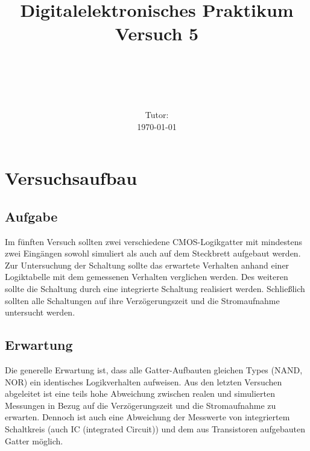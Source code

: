 \documentclass[11pt, a4paper]{article}
\title{\textbf{Digitalelektronisches Praktikum\\ Versuch 5}}
\author{\ATutantName \\ \emph{\ATutantEmail} \and \BTutantName\\ \emph{\BTutantEmail}}
\date{\Gruppennummer \\[3ex] Tutor: \Tutorname \\[3ex] \today}
\begin{document}
\clearpage
\maketitle
\thispagestyle{empty}
\newpage


\section*{Versuchsaufbau}
\subsection*{Aufgabe}
Im fünften Versuch sollten zwei verschiedene CMOS-Logikgatter mit mindestens zwei Eingängen sowohl simuliert als auch auf dem Steckbrett aufgebaut werden. Zur Untersuchung der Schaltung sollte das erwartete Verhalten anhand einer Logiktabelle mit dem gemessenen Verhalten verglichen werden. Des weiteren sollte die Schaltung durch eine integrierte Schaltung realisiert werden. Schließlich sollten alle Schaltungen auf ihre Verzögerungszeit und die Stromaufnahme untersucht werden.
\subsection*{Erwartung}
Die generelle Erwartung ist, dass alle Gatter-Aufbauten gleichen Types (NAND, NOR) ein identisches Logikverhalten aufweisen. Aus den letzten Versuchen abgeleitet ist eine teils hohe Abweichung zwischen realen und simulierten Messungen in Bezug auf die Verzögerungszeit und die Stromaufnahme zu erwarten. Dennoch ist auch eine Abweichung der Messwerte von integriertem Schaltkreis (auch IC (integrated Circuit)) und dem aus Transistoren aufgebauten Gatter möglich.

\end{document}
